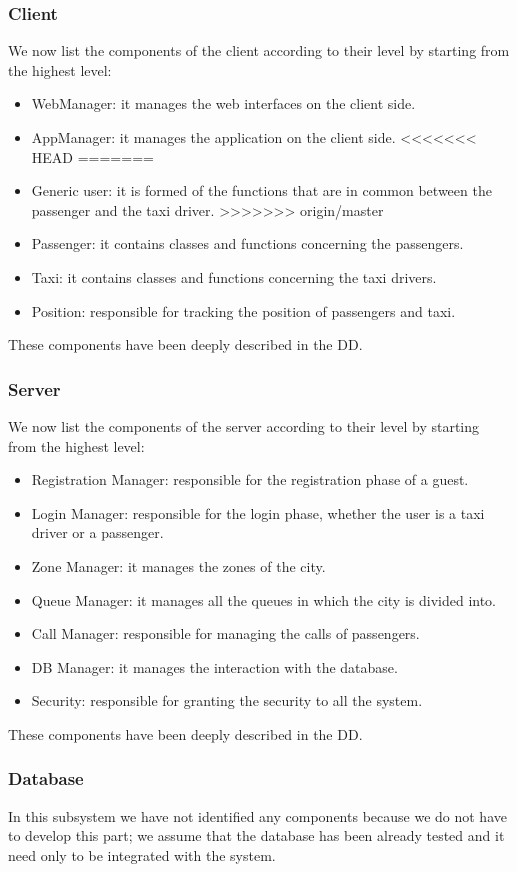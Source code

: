 \subsubsection{Client}
We now list the components of the client according to their level by starting from the highest level:
\begin{itemize}
    \item WebManager: it manages the web interfaces on the client side.
    \item AppManager: it manages the application on the client side.
<<<<<<< HEAD
=======
    \item Generic user: it is formed of the functions that are in common between the passenger and the taxi driver.
>>>>>>> origin/master
    \item Passenger: it contains classes and functions concerning the passengers.
    \item Taxi: it contains classes and functions concerning the taxi drivers.
    \item Position: responsible for tracking the position of passengers and taxi.
\end{itemize}
These components have been deeply described in the DD.

\subsubsection{Server}
We now list the components of the server according to their level by starting from the highest level:
\begin{itemize}
    \item Registration Manager: responsible for the registration phase of a guest.
    \item Login Manager: responsible for the login phase, whether the user is a taxi driver or a passenger.
    \item Zone Manager: it manages the zones of the city.
    \item Queue Manager: it manages all the queues in which the city is divided into.
    \item Call Manager: responsible for managing the calls of passengers.
    \item DB Manager: it manages the interaction with the database.
    \item Security: responsible for granting the security to all the system.
\end{itemize}
These components have been deeply described in the DD.

\subsubsection{Database}
In this subsystem we have not identified any components because we do not have to develop this part; we assume that the database has been already tested and it need only to be integrated with the system.






